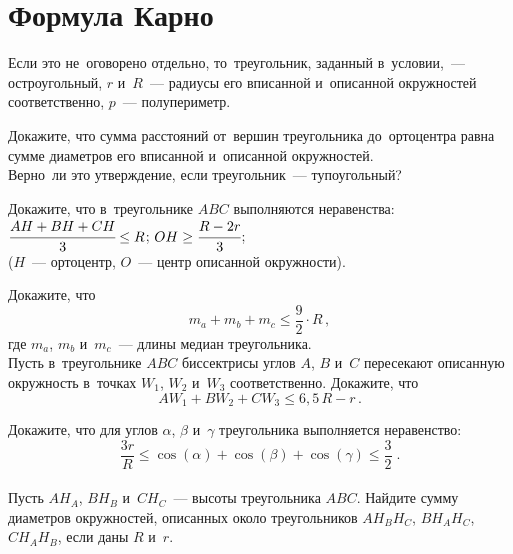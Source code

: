 
\section*{Формула Карно}


Если это не~оговорено отдельно, то~треугольник, заданный в~условии,~---
остроугольный, $r$ и~$R$~--- радиусы его вписанной и~описанной окружностей
соответственно, $p$~--- полупериметр.

\begin{problems}

\item
\subproblem
Докажите, что сумма расстояний от~вершин треугольника до~ортоцентра равна сумме
диаметров его вписанной и~описанной окружностей.
\\
\subproblem
Верно~ли это утверждение, если треугольник~--- тупоугольный?

\item
Докажите, что в~треугольнике $ABC$ выполняются неравенства:
\\[0.5ex]
\subproblem $\cfrac{AH + BH + CH}{3} \leq R$;
\qquad
\subproblem $OH \geq \cfrac{R - 2 r}{3}$;
\\[0.5ex]
($H$~--- ортоцентр, $O$~--- центр описанной окружности).

\item
\subproblem
Докажите, что
\[
    m_{a} + m_{b} + m_{c}
\leq
    \frac{9}{2} \cdot R
\, , \]
где $m_{a}$, $m_{b}$ и~$m_{c}$~--- длины медиан треугольника.
\\
\subproblem
Пусть в~треугольнике $ABC$ биссектрисы углов $A$, $B$ и~$C$ пересекают
описанную окружность в~точках $W_1$, $W_2$ и~$W_3$ соответственно.
Докажите, что
\[
    A W_1 + B W_2 + C W_3
\leq
    6{,}5 \, R - r
\, . \]

\item
\subproblem
Докажите, что для углов $\alpha$, $\beta$ и~$\gamma$ треугольника выполняется
неравенство:
\[
    \frac{3 r}{R}
\leq
    \cos(\alpha) + \cos(\beta) + \cos(\gamma)
\leq
    \frac{3}{2}
\; . \]
\\
\subproblem
Пусть $A H_{A}$, $B H_{B}$ и~$C H_{C}$~--- высоты треугольника $ABC$.
Найдите сумму диаметров окружностей, описанных около треугольников
$A H_{B} H_{C}$, $B H_{A} H_{C}$, $C H_{A} H_{B}$, если даны $R$ и~$r$.


\end{problems}
